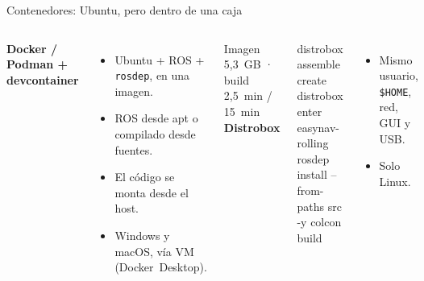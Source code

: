 \documentclass[aspectratio=169]{beamer}
\begin{document}
\begin{frame}[fragile]{Contenedores: Ubuntu, pero dentro de una caja}
\begin{columns}[T]
\textbf{Docker / Podman + devcontainer}
\begin{itemize}
  \item Ubuntu + ROS + \texttt{rosdep}, en una imagen.
  \item ROS desde apt o compilado desde fuentes.
  \item El código se monta desde el host.
  \item Windows y macOS, vía VM (Docker~Desktop).
\end{itemize}
\vspace{0.3em}
{\small Imagen 5,3~GB · build 2,5~min / 15~min}
\textbf{Distrobox}
\begin{terminal}
distrobox assemble create
distrobox enter easynav-rolling
rosdep install --from-paths src -y
colcon build
\end{terminal}
\begin{itemize}
  \item Mismo usuario, \texttt{\$HOME}, red, GUI y USB.
  \item Solo Linux.
\end{itemize}
\end{columns}
\end{frame}


\end{document}
